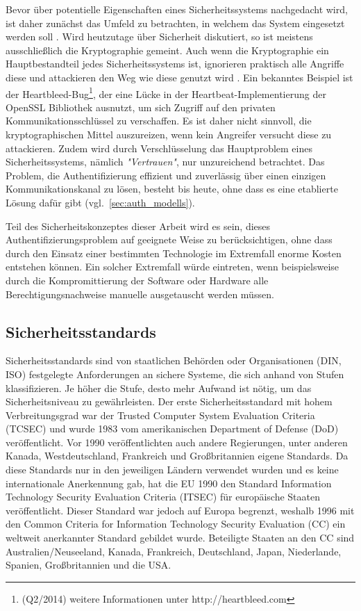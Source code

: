 \documentclass[11pt,a4paper]{report}
\begin{document}
Bevor über potentielle Eigenschaften eines Sicherheitssystems nachgedacht wird, ist daher zunächst das Umfeld zu betrachten, in welchem das System eingesetzt werden soll \cite[s.~4]{gutmann}. Wird heutzutage über Sicherheit diskutiert, so ist meistens ausschließlich die Kryptographie gemeint. Auch wenn die Kryptographie ein Hauptbestandteil jedes Sicherheitssystems ist, ignorieren praktisch alle Angriffe diese und attackieren den Weg wie diese genutzt wird \cite[s.~1]{gutmann}. Ein bekanntes Beispiel ist der Heartbleed-Bug\footnote{(Q2/2014) weitere Informationen unter http://heartbleed.com}, der eine Lücke in der Heartbeat-Implementierung der OpenSSL Bibliothek ausnutzt, um sich Zugriff auf den privaten Kommunikationsschlüssel zu verschaffen. Es ist daher nicht sinnvoll, die kryptographischen Mittel auszureizen, wenn kein Angreifer versucht diese zu attackieren. Zudem wird durch Verschlüsselung das Hauptproblem eines Sicherheitssystems, nämlich \textit{"Vertrauen"}, nur unzureichend betrachtet. Das Problem, die Authentifizierung effizient und zuverlässig über einen einzigen Kommunikationskanal zu lösen, besteht bis heute, ohne dass es eine etablierte Lösung dafür gibt (vgl.~\ref{sec:auth_modells}). 

Teil des Sicherheitskonzeptes dieser Arbeit wird es sein, dieses Authentifizierungsproblem auf geeignete Weise zu berücksichtigen, ohne dass durch den Einsatz einer bestimmten Technologie im Extremfall enorme Kosten entstehen können. Ein solcher Extremfall würde eintreten, wenn beispielsweise durch die Kompromittierung der Software oder Hardware alle Berechtigungsnachweise manuelle ausgetauscht werden müssen.

\subsection{Sicherheitsstandards} \label{sec:sec_standard}

Sicherheitsstandards sind von staatlichen Behörden oder Organisationen (DIN, ISO) festgelegte Anforderungen an sichere Systeme, die sich anhand von Stufen klassifizieren. Je höher die Stufe, desto mehr Aufwand ist nötig, um das Sicherheitsniveau zu gewährleisten. Der erste Sicherheitsstandard mit hohem Verbreitungsgrad war der Trusted Computer System Evaluation Criteria (TCSEC) und wurde 1983 vom amerikanischen Department of Defense (DoD) veröffentlicht. Vor 1990 veröffentlichten auch andere Regierungen, unter anderen Kanada, Westdeutschland, Frankreich und Großbritannien eigene Standards. Da diese Standards nur in den jeweiligen Ländern verwendet wurden und es keine internationale Anerkennung gab, hat die EU 1990 den Standard Information Technology Security Evaluation Criteria (ITSEC) für europäische Staaten veröffentlicht. Dieser Standard war jedoch auf Europa begrenzt, weshalb 1996 mit den Common Criteria for Information Technology Security Evaluation (CC) ein weltweit anerkannter Standard gebildet wurde. Beteiligte Staaten an den CC sind Australien/Neuseeland, Kanada, Frankreich, Deutschland, Japan, Niederlande, Spanien, Großbritannien und die USA.
\end{document}
